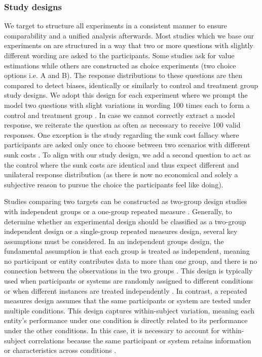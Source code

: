 \subsubsection{Study designs}
\par We target to structure all experiments in a consistent manner to ensure comparability and a unified analysis afterwards. Most studies which we base our experiments on are structured in a way that two or more questions with slightly different wording are asked to the participants. Some studies ask for value estimations while others are constructed as choice experiments (two choice options i.e. A and B). The response distributions to these questions are then compared to detect biases, identically or similarly to control and treatment group study designs. We adopt this design for each experiment where we prompt the model two questions with slight variations in wording 100 times each to form a control and treatment group \parencite{cohen1988statistical,morris2002combining}. In case we cannot correctly extract a model response, we reiterate the question as often as necessary to receive 100 valid responses. One exception is the study regarding the sunk cost fallacy where participants are asked only once to choose between two scenarios with different sunk costs \parencite{arkes1985psychology}. To align with our study design, we add a second question to act as the control where the sunk costs are identical and thus expect different and unilateral response distribution (as there is now no economical and solely a subjective reason to pursue the choice the participants feel like doing).

\par Studies comparing two targets can be constructed as two-group design studies with independent groups or a one-group repeated measure \parencite{dunlap1996meta,goulet2018review}. Generally, to determine whether an experimental design should be classified as a two-group independent design or a single-group repeated measures design, several key assumptions must be considered. In an independent groups design, the fundamental assumption is that each group is treated as independent, meaning no participant or entity contributes data to more than one group, and there is no connection between the observations in the two groups \parencite{morris2002combining}. This design is typically used when participants or systems are randomly assigned to different conditions or when different instances are treated independently \parencite{cohen1988statistical,morris2002combining}. In contrast, a repeated measures design assumes that the same participants or system are tested under multiple conditions. This design captures within-subject variation, meaning each entity's performance under one condition is directly related to its performance under the other conditions. In this case, it is necessary to account for within-subject correlations because the same participant or system retains information or characteristics across conditions \parencite{dunlap1996meta,morris2002combining}.

